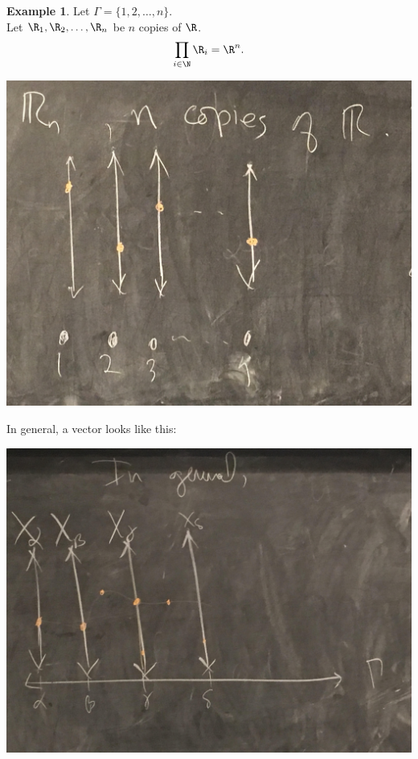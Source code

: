 \documentclass[a5paper]{article}
\theoremstyle{definition}%
\newtheorem*{example*}{Example}
\numberwithin{exercise}{section}
\theoremstyle{remark}%
\begin{document}
\begin{example*}
Let $\Gamma=\{1,2,\ldots, n\}$.\\
Let $\R_1, \R_2, \ldots, \R_n$ be $n$ copies of $\R$. 
$$\prod_{i\in\N} \R_i = \R^n. $$
\end{example*}

\begin{center}
\includegraphics[scale=.04]{images/general_products3}
\end{center}

In general, a vector looks like this:
\begin{center}
\includegraphics[scale=.04]{images/general_products4}
\end{center}
\end{document}
